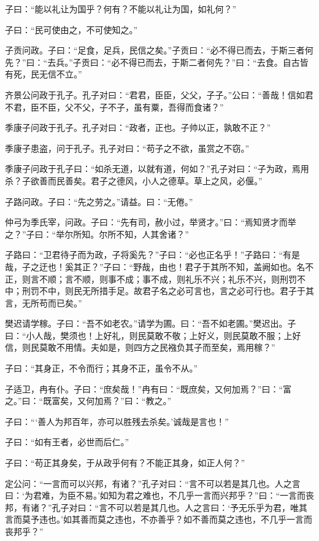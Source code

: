 \documentclass[a5paper]{ctexbook}
\begin{document}
    子曰：“能以礼让为国乎？何有？不能以礼让为国，如礼何？”

    子曰：“民可使由之，不可使知之。”

    子贡问政。子曰：“足食，足兵，民信之矣。”子贡曰：“必不得已而去，于斯三者何先？”曰：“去兵。”子贡曰：“必不得已而去，于斯二者何先？”曰：“去食。自古皆有死，民无信不立。”

    齐景公问政于孔子。孔子对曰：“君君，臣臣，父父，子子。”公曰：“善哉！信如君不君，臣不臣，父不父，子不子，虽有粟，吾得而食诸？”

    季康子问政于孔子。孔子对曰：“政者，正也。子帅以正，孰敢不正？”

    季康子患盗，问于孔子。孔子对曰：“苟子之不欲，虽赏之不窃。”

    季康子问政于孔子曰：“如杀无道，以就有道，何如？”孔子对曰：“子为政，焉用杀？子欲善而民善矣。君子之德风，小人之德草。草上之风，必偃。”

    子路问政。子曰：“先之劳之。”请益。曰：“无倦。”

    仲弓为季氏宰，问政。子曰：“先有司，赦小过，举贤才。”曰：“焉知贤才而举之？”子曰：“举尔所知。尔所不知，人其舍诸？”

    子路曰：“卫君待子而为政，子将奚先？”子曰：“必也正名乎！”子路曰：“有是哉，子之迂也！奚其正？”子曰：“野哉，由也！君子于其所不知，盖阙如也。名不正，则言不顺；言不顺，则事不成；事不成，则礼乐不兴；礼乐不兴，则刑罚不中；刑罚不中，则民无所措手足。故君子名之必可言也，言之必可行也。君子于其言，无所苟而已矣。”

    樊迟请学稼。子曰：“吾不如老农。”请学为圃。曰：“吾不如老圃。”樊迟出。子曰：“小人哉，樊须也！上好礼，则民莫敢不敬；上好义，则民莫敢不服；上好信，则民莫敢不用情。夫如是，则四方之民襁负其子而至矣，焉用稼？”

    子曰：“其身正，不令而行；其身不正，虽令不从。”

    子适卫，冉有仆。子曰：“庶矣哉！”冉有曰：“既庶矣，又何加焉？”曰：“富之。”曰：“既富矣，又何加焉？”曰：“教之。”

    子曰：“‘善人为邦百年，亦可以胜残去杀矣。’诚哉是言也！”

    子曰：“如有王者，必世而后仁。”

    子曰：“苟正其身矣，于从政乎何有？不能正其身，如正人何？”

    定公问：“一言而可以兴邦，有诸？”孔子对曰：“言不可以若是其几也。人之言曰：‘为君难，为臣不易。’如知为君之难也，不几乎一言而兴邦乎？”曰：“一言而丧邦，有诸？”孔子对曰：“言不可以若是其几也。人之言曰：‘予无乐乎为君，唯其言而莫予违也。’如其善而莫之违也，不亦善乎？如不善而莫之违也，不几乎一言而丧邦乎？”
\end{document}

